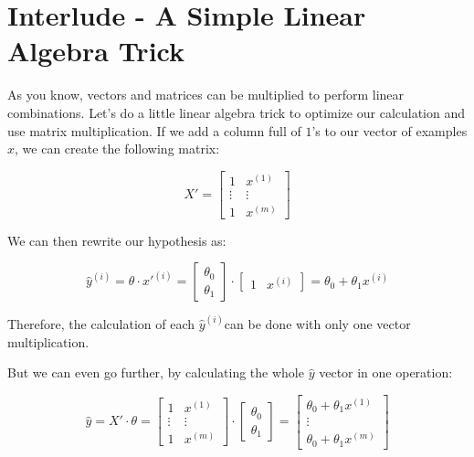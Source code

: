 
\section*{Interlude - A Simple Linear Algebra Trick}

As you know, vectors and matrices can be multiplied to perform linear combinations.  
Let's do a little linear algebra trick to optimize our calculation and use matrix multiplication.  
If we add a column full of $1$'s to our vector of examples $x$, we can create the following matrix: 

$$
X' = \begin{bmatrix} 1 & x^{(1)} \\ \vdots & \vdots \\ 1 & x^{(m)}\end{bmatrix}
$$
  
We can then rewrite our hypothesis as: 

$$
\hat{y}^{(i)} = \theta \cdot x'^{(i)} = \begin{bmatrix}\theta_0 \\ \theta_1 \end{bmatrix}  \cdot \begin{bmatrix} 1 & x^{(i)} \end{bmatrix} = \theta_0 + \theta_1 x^{(i)}
$$

Therefore, the calculation of each $\hat{y}^{(i)}$can be done with only one vector multiplication. 

But we can even go further, by calculating the whole $\hat{y}$ vector in one operation: 

$$
\hat{y} = X' \cdot \theta = \begin{bmatrix} 1 & x^{(1)} \\ \vdots & \vdots \\ 1 & x^{(m)}\end{bmatrix}\cdot\begin{bmatrix}\theta_0 \\ \theta_1 \end{bmatrix} = \begin{bmatrix} \theta_0 + \theta_1 x^{(1)} \\ \vdots \\ \theta_0 + \theta_1 x^{(m)} \end{bmatrix}
$$

